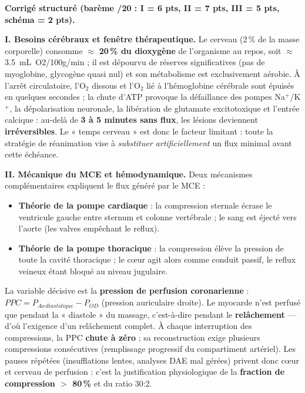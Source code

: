 \documentclass[11pt]{article}
\begin{document}
\begin{corrige}
\textbf{Corrigé structuré (barème /20 : I = 6 pts, II = 7 pts, III = 5 pts, schéma = 2 pts).}

\textbf{I. Besoins cérébraux et fenêtre thérapeutique.} Le cerveau (2\,\% de la masse corporelle) consomme $\approx$ \textbf{20\,\% du dioxygène} de l'organisme au repos, soit $\approx$ \SI{3,5}{mL O2/100g/min} ; il est dépourvu de réserves significatives (pas de myoglobine, glycogène quasi nul) et son métabolisme est exclusivement aérobie. À l'arrêt circulatoire, l'O$_2$ dissous et l'O$_2$ lié à l'hémoglobine cérébrale sont épuisés en quelques secondes ; la chute d'ATP provoque la défaillance des pompes Na$^+$/K$^+$, la dépolarisation neuronale, la libération de glutamate excitotoxique et l'entrée calcique : au-delà de \textbf{3 à 5 minutes sans flux}, les lésions deviennent \textbf{irréversibles}. Le « temps cerveau » est donc le facteur limitant : toute la stratégie de réanimation vise à \emph{substituer artificiellement} un flux minimal avant cette échéance.

\textbf{II. Mécanique du MCE et hémodynamique.} Deux mécanismes complémentaires expliquent le flux généré par le MCE :
\begin{itemize}
    \item \textbf{Théorie de la pompe cardiaque} : la compression sternale écrase le ventricule gauche entre sternum et colonne vertébrale ; le sang est éjecté vers l'aorte (les valves empêchant le reflux).
    \item \textbf{Théorie de la pompe thoracique} : la compression élève la pression de toute la cavité thoracique ; le cœur agit alors comme conduit passif, le reflux veineux étant bloqué au niveau jugulaire.
\end{itemize}
La variable décisive est la \textbf{pression de perfusion coronarienne} : $PPC = P_{Ao\,diastolique} - P_{OD}$ (pression auriculaire droite). Le myocarde n'est perfusé que pendant la « diastole » du massage, c'est-à-dire pendant le \textbf{relâchement} — d'où l'exigence d'un relâchement complet. À chaque interruption des compressions, la PPC \textbf{chute à zéro} ; sa reconstruction exige plusieurs compressions consécutives (remplissage progressif du compartiment artériel). Les pauses répétées (insufflations lentes, analyses DAE mal gérées) privent donc cœur et cerveau de perfusion : c'est la justification physiologique de la \textbf{fraction de compression $>$ 80\,\%} et du ratio 30:2.


\end{corrige}
\end{document}
